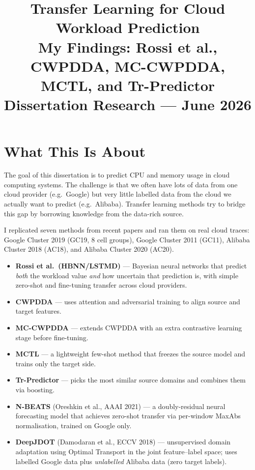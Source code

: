 \documentclass[12pt,a4paper]{article}
\title{%
  \textbf{Transfer Learning for Cloud Workload Prediction}\\[0.5em]
  \large My Findings: Rossi et al., CWPDDA, MC-CWPDDA, MCTL, and Tr-Predictor\\[0.3em]
  \normalsize Dissertation Research --- June 2026
}
\author{}
\date{}
\begin{document}
\maketitle
\tableofcontents
\newpage

\section{What This Is About}

The goal of this dissertation is to predict CPU and memory usage in cloud
computing systems. The challenge is that we often have lots of data from one
cloud provider (e.g.\ Google) but very little labelled data from the cloud we
actually want to predict (e.g.\ Alibaba). Transfer learning methods try to
bridge this gap by borrowing knowledge from the data-rich source.

I replicated seven methods from recent papers and ran them on real cloud traces:
Google Cluster 2019 (GC19, 8 cell groups), Google Cluster 2011 (GC11),
Alibaba Cluster 2018 (AC18), and Alibaba Cluster 2020 (AC20).

\begin{itemize}
  \item \textbf{\textcolor{rossicolor}{Rossi et al.\ (HBNN/LSTMD)}} --- Bayesian
        neural networks that predict \emph{both} the workload value \emph{and}
        how uncertain that prediction is, with simple zero-shot and fine-tuning
        transfer across cloud providers.
  \item \textbf{\textcolor{cwpcolor}{CWPDDA}} --- uses attention and adversarial
        training to align source and target features.
  \item \textbf{\textcolor{mccolor}{MC-CWPDDA}} --- extends CWPDDA with an extra
        contrastive learning stage before fine-tuning.
  \item \textbf{\textcolor{mctlcolor}{MCTL}} --- a lightweight few-shot method
        that freezes the source model and trains only the target side.
  \item \textbf{\textcolor{trcolor}{Tr-Predictor}} --- picks the most similar
        source domains and combines them via boosting.
  \item \textbf{\textcolor{nbeatscolor}{N-BEATS}} (Oreshkin et al., AAAI 2021)
        --- a doubly-residual neural forecasting model that achieves zero-shot
        transfer via per-window MaxAbs normalisation, trained on Google only.
  \item \textbf{\textcolor{djdotcolor}{DeepJDOT}} (Damodaran et al., ECCV 2018)
        --- unsupervised domain adaptation using Optimal Transport in the joint
        feature--label space; uses labelled Google data plus \emph{unlabelled}
        Alibaba data (zero target labels).
\end{itemize}
\end{document}
